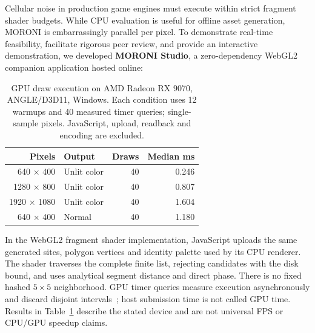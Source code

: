 \documentclass[sigconf,nonacm]{acmart}
\begin{document}
Cellular noise in production game engines must execute within strict fragment
shader budgets. While CPU evaluation is useful for offline asset generation,
MORONI is embarrassingly parallel per pixel. To demonstrate real-time feasibility,
facilitate rigorous peer review, and provide an interactive demonstration, we
developed \textbf{MORONI Studio}, a zero-dependency WebGL2 companion application
hosted online:

\begin{center}
\end{center}

\begin{table}[h]
\centering\small
\caption{GPU draw execution on AMD Radeon RX 9070, ANGLE/D3D11, Windows. Each
condition uses 12 warmups and 40 measured timer queries; single-sample pixels.
JavaScript, upload, readback and encoding are excluded.}
\label{tbl:gpu_perf}
\begin{tabular}{r l r r}\toprule
Pixels & Output & Draws & Median ms \\ \midrule
640 $\times$ 400 & Unlit color & 40 & 0.246 \\
1280 $\times$ 800 & Unlit color & 40 & 0.807 \\
1920 $\times$ 1080 & Unlit color & 40 & 1.604 \\
640 $\times$ 400 & Normal & 40 & 1.180 \\
\bottomrule\end{tabular}
\end{table}

In the WebGL2 fragment shader implementation, JavaScript uploads the same generated sites, polygon
vertices and identity palette used by its CPU renderer. The shader traverses
the complete finite list, rejecting candidates with the disk bound, and uses
analytical segment distance and direct phase. There is no fixed hashed
$5\times5$ neighborhood. GPU timer queries measure execution asynchronously
and discard disjoint intervals~\cite{khronos_timer}; host submission time is
not called GPU time. Results in Table~\ref{tbl:gpu_perf} describe the stated
device and are not universal FPS or CPU/GPU speedup claims.
\end{document}
